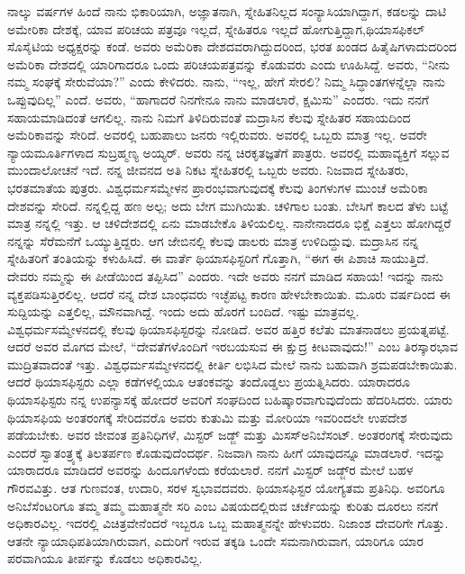 ನಾಲ್ಕು ವರ್ಷಗಳ ಹಿಂದೆ ನಾನು ಭಿಕಾರಿಯಾಗಿ, ಅಜ್ಞಾತನಾಗಿ, ಸ್ನೇಹಿತನಿಲ್ಲದ ಸಂನ್ಯಾಸಿಯಾಗಿದ್ದಾಗ, ಕಡಲನ್ನು ದಾಟಿ ಅಮೇರಿಕಾ ದೇಶಕ್ಕೆ, ಯಾವ ಪರಿಚಯ ಪತ್ರವೂ ಇಲ್ಲದೆ, ಸ್ನೇಹಿತರೂ ಇಲ್ಲದೆ ಹೋಗುತ್ತಿದ್ದಾಗ,\break ಥಿಯಾಸಫಿಕಲ್​ ಸೊಸೈಟಿಯ ಅಧ್ಯಕ್ಷರನ್ನು ಕಂಡೆ. ಅವರು ಅಮೆರಿಕಾ ದೇಶ\-ದವರಾಗಿದ್ದುದರಿಂದ, ಭರತ ಖಂಡದ ಹಿತೈಷಿಗಳಾದುದರಿಂದ ಅಮೆರಿಕಾ ದೇಶದಲ್ಲಿ ಯಾರಿಗಾದರೂ ಒಂದು ಪರಿಚಯಪತ್ರವನ್ನು ಕೊಡುವರು ಎಂದು ಊಹಿಸಿದ್ದೆ. ಅವರು, “ನೀನು ನಮ್ಮ ಸಂಘಕ್ಕೆ ಸೇರುವೆಯಾ?” ಎಂದು ಕೇಳಿದರು. ನಾನು, “ಇಲ್ಲ, ಹೇಗೆ ಸೇರಲಿ? ನಿಮ್ಮ ಸಿದ್ಧಾಂತಗಳನ್ನೆಲ್ಲಾ ನಾನು ಒಪ್ಪುವುದಿಲ್ಲ” ಎಂದೆ. ಅವರು, “ಹಾಗಾದರೆ ನಿನಗೇನೂ ನಾನು ಮಾಡಲಾರೆ, ಕ್ಷಮಿಸು” ಎಂದರು. ಇದು ನನಗೆ ಸಹಾಯಮಾಡಿದಂತೆ ಆಗಲಿಲ್ಲ. ನಾನು ನಿಮಗೆ ತಿಳಿದಿರುವಂತೆ ಮದ್ರಾಸಿನ ಕೆಲವು ಸ್ನೇಹಿತರ ಸಹಾಯದಿಂದ ಅಮೆರಿಕಾವನ್ನು ಸೇರಿದೆ. ಅವರಲ್ಲಿ ಬಹುಪಾಲು ಜನರು ಇಲ್ಲಿರುವರು. ಅವರಲ್ಲಿ ಒಬ್ಬರು ಮಾತ್ರ ಇಲ್ಲ. ಅವರೇ ನ್ಯಾಯಮೂರ್ತಿಗಳಾದ ಸುಬ್ರಹ್ಮಣ್ಯ ಅಯ್ಯರ್​. ಅವರು ನನ್ನ ಚಿರಕೃತಜ್ಞತೆಗೆ ಪಾತ್ರರು. ಅವರಲ್ಲಿ ಮಹಾವ್ಯಕ್ತಿಗೆ ಸಲ್ಲುವ ಮುಂದಾಲೋಚನೆ ಇದೆ. ನನ್ನ ಜೀವನದ ಅತಿ ನಿಕಟ ಸ್ನೇಹಿತರಲ್ಲಿ ಒಬ್ಬರು ಅವರು. ನಿಜವಾದ ಸ್ನೇಹಿತರು, ಭರತಮಾತೆಯ ಪುತ್ರರು. ವಿಶ್ವಧರ್ಮಸಮ್ಮೇಳನ ಪ್ರಾರಂಭವಾಗುವುದಕ್ಕೆ ಕೆಲವು ತಿಂಗಳುಗಳ ಮುಂಚೆ ಅಮೆರಿಕಾ ದೇಶವನ್ನು ಸೇರಿದೆ. ನನ್ನಲ್ಲಿದ್ದ ಹಣ ಅಲ್ಪ; ಅದು ಬೇಗ ಮುಗಿಯಿತು. ಚಳಿಗಾಲ ಬಂತು. ಬೇಸಿಗೆ ಕಾಲದ ತೆಳು ಬಟ್ಟೆ ಮಾತ್ರ ನನ್ನಲ್ಲಿ ಇತ್ತು. ಆ ಚಳಿದೇಶದಲ್ಲಿ ಏನು ಮಾಡಬೇಕೊ ತಿಳಿಯಲಿಲ್ಲ. ನಾನೇನಾದರೂ ಭಿಕ್ಷೆ ಎತ್ತಲು ಹೋಗಿದ್ದರೆ ನನ್ನನ್ನು ಸೆರೆಮನೆಗೆ ಒಯ್ಯುತ್ತಿದ್ದರು. ಆಗ ಜೇಬಿನಲ್ಲಿ ಕೆಲವು ಡಾಲರು ಮಾತ್ರ ಉಳಿದಿದ್ದುವು. ಮದ್ರಾಸಿನ ನನ್ನ ಸ್ನೇಹಿತರಿಗೆ ತಂತಿಯನ್ನು ಕಳುಹಿಸಿದೆ. ಈ ವಾರ್ತೆ ಥಿಯಾಸಫಿಸ್ಟರಿಗೆ ಗೊತ್ತಾಗಿ, “ಈಗ ಈ ಪಿಶಾಚಿ ಸಾಯುತ್ತಿದೆ. ದೇವರು ನಮ್ಮನ್ನು ಈ ಪೀಡೆಯಿಂದ ತಪ್ಪಿಸಿದ” ಎಂದರು. ಇದೇ ಅವರು ನನಗೆ ಮಾಡಿದ ಸಹಾಯ! ಇದನ್ನು ನಾನು ವ್ಯಕ್ತಪಡಿಸುತ್ತಿರಲಿಲ್ಲ. ಆದರೆ ನನ್ನ ದೇಶ ಬಾಂಧವರು ಇಚ್ಛೆಪಟ್ಟ ಕಾರಣ ಹೇಳಬೇಕಾಯಿತು. ಮೂರು ವರ್ಷದಿಂದ ಈ ಸುದ್ದಿಯನ್ನು ಎತ್ತಲಿಲ್ಲ, ಮೌನವಾಗಿದ್ದೆ. ಇಂದು ಅದು ಹೊರಗೆ ಬಂದಿದೆ. ಇಷ್ಟು ಮಾತ್ರವಲ್ಲ. ವಿಶ್ವಧರ್ಮಸಮ್ಮೇಳನದಲ್ಲಿ ಕೆಲವು ಥಿಯಾಸಫಿಸ್ಟರನ್ನು ನೋಡಿದೆ. ಅವರ ಹತ್ತಿರ ಕಲೆತು ಮಾತನಾಡಲು ಪ್ರಯತ್ನಪಟ್ಟೆ. ಆದರೆ ಅವರ ಮೊಗದ ಮೇಲೆ, “ದೇವತೆಗಳೊಂದಿಗೆ ಇರಬಯಸುವ ಈ ಕ್ಷುದ್ರ ಕೀಟವಾವುದು!” ಎಂಬ ತಿರಸ್ಕಾರಭಾವ ಮುದ್ರಿತವಾದಂತೆ ಇತ್ತು. ವಿಶ್ವಧರ್ಮಸಮ್ಮೇಳನದಲ್ಲಿ ಕೀರ್ತಿ ಲಭಿಸಿದ ಮೇಲೆ ನಾನು ಬಹುವಾಗಿ ಶ್ರಮಪಡಬೇಕಾಯಿತು. ಆದರೆ ಥಿಯಾಸಫಿಸ್ಟರು ಎಲ್ಲಾ ಕಡೆಗಳಲ್ಲಿಯೂ ಆತಂಕವನ್ನು ತಂದೊಡ್ಡಲು ಪ್ರಯತ್ನಿಸಿದರು. ಯಾರಾದರೂ ಥಿಯಾಸಫಿಸ್ಟರು ನನ್ನ ಉಪನ್ಯಾಸಕ್ಕೆ ಹೋದರೆ ಅವರಿಗೆ ಸಂಘದಿಂದ ಬಹಿಷ್ಕಾರವಾಗುವುದೆಂದು ಹೆದರಿಸಿದರು. ಯಾರು ಥಿಯಾಸಫಿಯ ಅಂತರಂಗಕ್ಕೆ ಸೇರಿದವರೊ ಅವರು ಕುತುಮಿ ಮತ್ತು ಮೋರಿಯಾ ಇವರಿಂದಲೇ ಉಪದೇಶ ಪಡೆಯಬೇಕು. ಅವರ ಜೀವಂತ ಪ್ರತಿನಿಧಿಗಳೆ, ಮಿಸ್ಟರ್​ ಜಡ್ಜ್ ಮತ್ತು ಮಿಸಸ್​ ಅನಿಬೆಸಂಟ್​. ಅಂತರಂಗಕ್ಕೆ ಸೇರುವುದು ಎಂದರೆ ಸ್ವಾತಂತ್ರ್ಯಕ್ಕೆ ತಿಲತರ್ಪಣ ಕೊಡುವುದೆಂದರ್ಥ. ನಿಜವಾಗಿ ನಾನು ಹೀಗೆ ಯಾವುದನ್ನೂ ಮಾಡಲಾರೆ. ಇದನ್ನು ಯಾರಾದರೂ ಮಾಡಿದರೆ ಅವರನ್ನು ಹಿಂದೂಗಳೆಂದು ಕರೆಯಲಾರೆ. ನನಗೆ ಮಿಸ್ಟರ್​ ಜಡ್ಜ್‌ರ ಮೇಲೆ ಬಹಳ ಗೌರವವಿತ್ತು. ಆತ ಗುಣವಂತ, ಉದಾರಿ, ಸರಳ ಸ್ವಭಾವದವರು. ಥಿಯಾಸಫಿಸ್ಟರ ಯೋಗ್ಯತಮ ಪ್ರತಿನಿಧಿ. ಅವರಿಗೂ ಅನಿಬೆಸೆಂಟರಿಗೂ ತಮ್ಮ ತಮ್ಮ ಮಹಾತ್ಮನೇ ಸರಿ ಎಂಬ ವಿಷಯದಲ್ಲಿರುವ ಚರ್ಚೆಯನ್ನು ಕುರಿತು ದೂರಲು ನನಗೆ ಅಧಿಕಾರವಿಲ್ಲ. ಇದರಲ್ಲಿ ವಿಚಿತ್ರವೇನೆಂದರೆ ಇಬ್ಬರೂ ಒಬ್ಬ ಮಹಾತ್ಮನನ್ನೇ ಹೇಳುವರು. ನಿಜಾಂಶ ದೇವರಿಗೇ ಗೊತ್ತು. ಆತನೇ ನ್ಯಾಯಾಧಿಪತಿಯಾಗಿರುವಾಗ, ಎದುರಿಗೆ ಇರುವ ತಕ್ಕಡಿ ಒಂದೇ ಸಮನಾಗಿರುವಾಗ, ಯಾರಿಗೂ ಯಾರ ಪರವಾಗಿಯೂ ತೀರ್ಪನ್ನು ಕೊಡಲು ಅಧಿಕಾರವಿಲ್ಲ.

